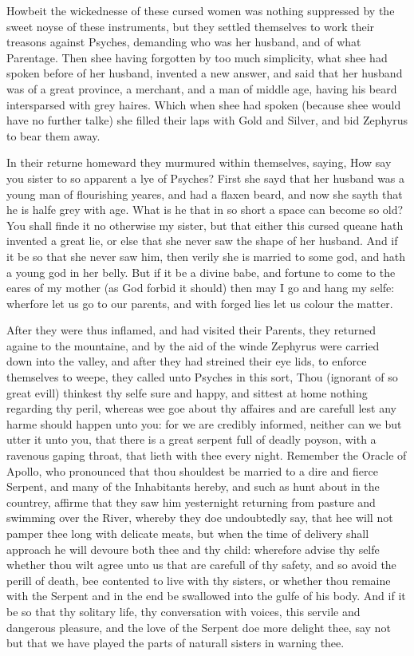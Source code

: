 Howbeit the wickednesse of these cursed women was nothing suppressed by the
sweet noyse of these instruments, but they settled themselves to work their
treasons against Psyches, demanding who was her husband, and of what Parentage.
Then shee having forgotten by too much simplicity, what shee had spoken before
of her husband, invented a new answer, and said that her husband was of a great
province, a merchant, and a man of middle age, having his beard intersparsed
with grey haires. Which when shee had spoken (because shee would have no
further talke) she filled their laps with Gold and Silver, and bid Zephyrus to
bear them away.

In their returne homeward they murmured within themselves, saying, How say you
sister to so apparent a lye of Psyches? First she sayd that her husband was a
young man of flourishing yeares, and had a flaxen beard, and now she sayth that
he is halfe grey with age. What is he that in so short a space can become so
old? You shall finde it no otherwise my sister, but that either this cursed
queane hath invented a great lie, or else that she never saw the shape of her
husband. And if it be so that she never saw him, then verily she is married to
some god, and hath a young god in her belly. But if it be a divine babe, and
fortune to come to the eares of my mother (as God forbid it should) then may I
go and hang my selfe: wherfore let us go to our parents, and with forged lies
let us colour the matter.

After they were thus inflamed, and had visited their Parents, they returned
againe to the mountaine, and by the aid of the winde Zephyrus were carried down
into the valley, and after they had streined their eye lids, to enforce
themselves to weepe, they called unto Psyches in this sort, Thou (ignorant of
so great evill) thinkest thy selfe sure and happy, and sittest at home nothing
regarding thy peril, whereas wee goe about thy affaires and are carefull lest
any harme should happen unto you: for we are credibly informed, neither can we
but utter it unto you, that there is a great serpent full of deadly poyson,
with a ravenous gaping throat, that lieth with thee every night. Remember the
Oracle of Apollo, who pronounced that thou shouldest be married to a dire and
fierce Serpent, and many of the Inhabitants hereby, and such as hunt about in
the countrey, affirme that they saw him yesternight returning from pasture and
swimming over the River, whereby they doe undoubtedly say, that hee will not
pamper thee long with delicate meats, but when the time of delivery shall
approach he will devoure both thee and thy child: wherefore advise thy selfe
whether thou wilt agree unto us that are carefull of thy safety, and so avoid
the perill of death, bee contented to live with thy sisters, or whether thou
remaine with the Serpent and in the end be swallowed into the gulfe of his
body. And if it be so that thy solitary life, thy conversation with voices,
this servile and dangerous pleasure, and the love of the Serpent doe more
delight thee, say not but that we have played the parts of naturall sisters in
warning thee.


